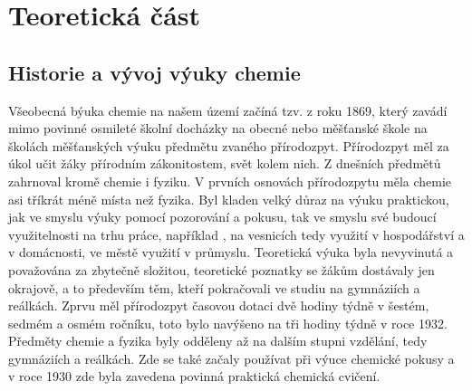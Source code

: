 \chapter{Teoretická část}

\section{Historie a vývoj výuky chemie}

Všeobecná býuka chemie na našem území začíná tzv.  z roku 1869, který zavádí mimo povinné osmileté školní docházky na obecné nebo měšťanské škole na školách měšťanských výuku předmětu zvaného přírodozpyt. Přírodozpyt měl za úkol učit žáky přírodním zákonitostem,  svět kolem nich. Z dnešních předmětů zahrnoval kromě chemie i fyziku. V prvních osnovách přírodozpytu měla chemie asi tříkrát méně místa než fyzika. Byl kladen velký důraz na výuku praktickou, jak ve smyslu výuky pomocí pozorování a pokusu, tak ve smyslu své budoucí využitelnosti na trhu práce, například , na vesnicích tedy využití v hospodářství a v domácnosti, ve městě využití v průmyslu. Teoretická výuka byla nevyvinutá a považována za zbytečně složitou, teoretické poznatky se žákům dostávaly jen okrajově, a to především těm, kteří pokračovali ve studiu na gymnáziích a reálkách. Zprvu měl přírodozpyt časovou dotaci dvě hodiny týdně v šestém, sedmém a osmém ročníku, toto bylo navýšeno na tři hodiny týdně v roce 1932.\cite{prirodozpyt} Předměty chemie a fyzika byly odděleny až na dalším stupni vzdělání, tedy gymnáziích a reálkách. Zde se také začaly používat při výuce chemické pokusy a v roce 1930 zde byla zavedena povinná praktická chemická cvičení.\cite{historie_vyuky}

